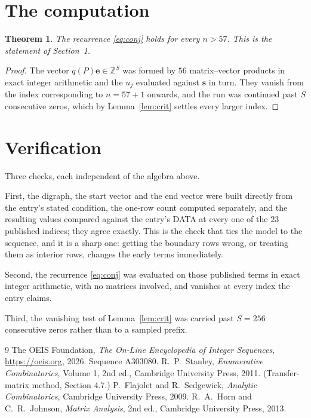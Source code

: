 \documentclass[11pt,a4paper]{article}
\theoremstyle{plain}
\newtheorem{theorem}{Theorem}
\theoremstyle{definition}
\begin{document}
\section{The computation}

\begin{theorem}
The recurrence \eqref{eq:conj} holds for every $n>57$. This is the statement of
Section~1.
\end{theorem}

\begin{proof}
The vector $q(P)\mathbf{e}\in\mathbb{Z}^{S}$ was formed by $56$ matrix--vector
products in exact integer arithmetic and the $u_j$ evaluated against $\mathbf{s}$ in turn.
They vanish from the index corresponding to $n=57+1$ onwards, and the run was continued
past $S$ consecutive zeros, which by Lemma~\ref{lem:crit} settles every larger index.
\end{proof}

\section{Verification}

Three checks, each independent of the algebra above.

First, the digraph, the start vector and the end vector were built directly from the
entry's stated condition, the one-row count computed separately, and the resulting values
compared against the entry's DATA at every one of the $23$ published indices; they
agree exactly. This is the check that ties the model to the sequence, and it is a sharp one:
getting the boundary rows wrong, or treating them as interior rows, changes the early terms
immediately.

Second, the recurrence \eqref{eq:conj} was evaluated on those published terms in exact
integer arithmetic, with no matrices involved, and vanishes at every index the entry claims.

Third, the vanishing test of Lemma~\ref{lem:crit} was carried past $S=256$ consecutive
zeros rather than to a sampled prefix.

\begin{thebibliography}{9}
 The OEIS Foundation, \emph{The On-Line Encyclopedia of Integer
Sequences}, \url{https://oeis.org}, 2026. Sequence A303080.
 R.~P.~Stanley, \emph{Enumerative Combinatorics}, Volume 1, 2nd ed.,
Cambridge University Press, 2011. (Transfer-matrix method, Section 4.7.)
 P.~Flajolet and R.~Sedgewick, \emph{Analytic Combinatorics}, Cambridge
University Press, 2009.
 R.~A.~Horn and C.~R.~Johnson, \emph{Matrix Analysis}, 2nd ed., Cambridge
University Press, 2013.
\end{thebibliography}
\end{document}
